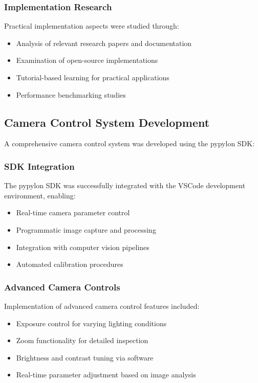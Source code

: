 \documentclass{book}
\begin{document}
\subsubsection{Implementation Research}
\par\noindent Practical implementation aspects were studied through:

\begin{itemize}
\item Analysis of relevant research papers and documentation
\item Examination of open-source implementations
\item Tutorial-based learning for practical applications
\item Performance benchmarking studies
\end{itemize}

\subsection{Camera Control System Development}
\par\noindent A comprehensive camera control system was developed using the pypylon SDK:

\subsubsection{SDK Integration}
\par\noindent The pypylon SDK was successfully integrated with the VSCode development environment, enabling:

\begin{itemize}
\item Real-time camera parameter control
\item Programmatic image capture and processing
\item Integration with computer vision pipelines
\item Automated calibration procedures
\end{itemize}

\subsubsection{Advanced Camera Controls}
\par\noindent Implementation of advanced camera control features included:

\begin{itemize}
\item Exposure control for varying lighting conditions
\item Zoom functionality for detailed inspection
\item Brightness and contrast tuning via software
\item Real-time parameter adjustment based on image analysis
\end{itemize}
\end{document}
